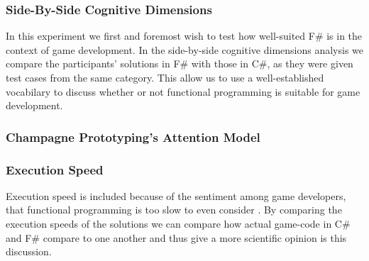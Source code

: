 \subsubsection{Side-By-Side Cognitive Dimensions}
In this experiment we first and foremost wish to test how well-suited F\# is in the context of game development. In the side-by-side cognitive dimensions analysis we compare the participants' solutions in F\# with those in C\#, as they were given test cases from the same category. This allow us to use a well-established vocabilary to discuss whether or not functional programming is suitable for game development.



\subsubsection{Champagne Prototyping's Attention Model}

\subsubsection{Execution Speed}
Execution speed is included because of the sentiment among game developers, that functional programming is too slow to even consider \cite{pop:functional:slow, pop:functional:sucks}. By comparing the execution speeds of the solutions we can compare how actual game-code in C\# and F\# compare to one another and thus give a more scientific opinion is this discussion.
